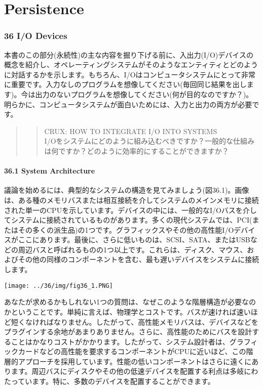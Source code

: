 \newpage

\part{Persistence}

\hypertarget{io-devices}{%
\section*{36 I/O Devices}\label{io-devices}}

本書のこの部分(永続性)の主な内容を掘り下げる前に、入出力(I/O)デバイスの概念を紹介し、オペレーティングシステムがそのようなエンティティとどのように対話するかを示します。もちろん、I/Oはコンピュータシステムにとって非常に重要です。入力なしのプログラムを想像してください(毎回同じ結果を出します)。今は出力のないプログラムを想像してください(何が目的なのですか？)。明らかに、コンピュータシステムが面白いためには、入力と出力の両方が必要です。

\begin{quote}
\begin{quote}
CRUX: HOW TO INTEGRATE I/O INTO SYSTEMS\\
I/Oをシステムにどのように組み込むべきですか？一般的な仕組みは何ですか？どのように効率的にすることができますか？
\end{quote}
\end{quote}

\hypertarget{system-architecture}{%
\subsection*{36.1 System Architecture}\label{system-architecture}}

議論を始めるには、典型的なシステムの構造を見てみましょう(図36.1)。画像は、ある種のメモリバスまたは相互接続を介してシステムのメインメモリに接続された単一のCPUを示しています。デバイスの中には、一般的なI/Oバスを介してシステムに接続されているものがあります。多くの現代システムでは、PCI(またはその多くの派生品)の1つです。グラフィックスやその他の高性能I/Oデバイスがここにあります。最後に、さらに低いものは、SCSI、SATA、またはUSBなどの周辺バスと呼ばれるものの1つ以上です。これらは、ディスク、マウス、およびその他の同様のコンポーネントを含む、最も遅いデバイスをシステムに接続します。

\texttt{[image: ../36/img/fig36\_1.PNG]}

あなたが求めるかもしれない1つの質問は、なぜこのような階層構造が必要なのかということです。単純に言えば、物理学とコストです。バスが速ければ速いほど短くなければなりません。したがって、高性能メモリバスは、デバイスなどをプラグインする余地があまりありません。さらに、高性能のためにバスを設計することはかなりコストがかかります。したがって、システム設計者は、グラフィックカードなどの高性能を要求するコンポーネントがCPUに近いほど、この階層的アプローチを採用しています。性能の低いコンポーネントはさらに遠くにあります。周辺バスにディスクやその他の低速デバイスを配置する利点は多岐にわたっています。特に、多数のデバイスを配置することができます。

